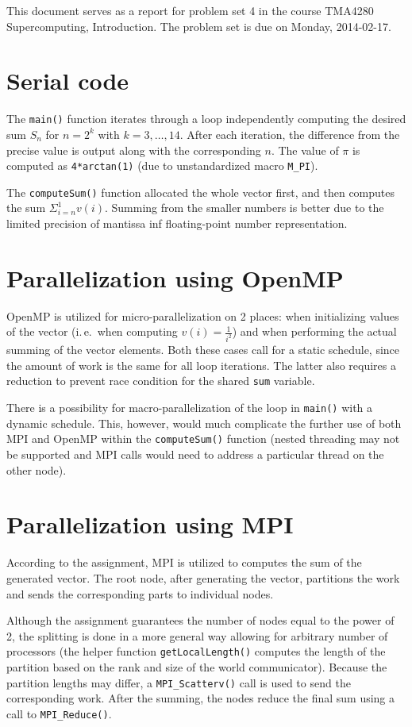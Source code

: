 \documentclass[12pt]{simple-assignment} %
\begin{document}
\noindent
This document serves as a report for problem set 4 in the course TMA4280 Supercomputing, Introduction. The problem set is due on Monday, 2014-02-17.

\section{Serial code}
The \texttt{main()} function iterates through a loop independently computing the desired sum $S_n$ for $n = 2^k$ with $k = 3, \dots, 14$. After each iteration, the difference from the precise value is output along with the corresponding $n$. The value of $\pi$ is computed as \texttt{4*arctan(1)} (due to unstandardized macro \texttt{M\_PI}).

The \texttt{computeSum()} function allocated the whole vector first, and then computes the sum $\Sigma_{i=n}^{1}v(i)$. Summing from the smaller numbers is better due to the limited precision of mantissa inf floating-point number representation.

\section{Parallelization using OpenMP}
OpenMP is utilized for micro-parallelization on 2 places: when initializing values of the vector (i.\,e.\ when computing $v(i)=\frac{1}{i^2}$) and when performing the actual summing of the vector elements. Both these cases call for a static schedule, since the amount of work is the same for all loop iterations. The latter also requires a reduction to prevent race condition for the shared \texttt{sum} variable.

There is a possibility for macro-parallelization of the loop in \texttt{main()} with a dynamic schedule. This, however, would much complicate the further use of both MPI and OpenMP within the \texttt{computeSum()} function (nested threading may not be supported and MPI calls would need to address a particular thread on the other node).

\section{Parallelization using MPI}
According to the assignment, MPI is utilized to computes the sum of the generated vector. The root node, after generating the vector, partitions the work and sends the corresponding parts to individual nodes. 

Although the assignment guarantees the number of nodes equal to the power of 2, the splitting is done in a more general way allowing for arbitrary number of processors (the helper function \texttt{getLocalLength()} computes the length of the partition based on the rank and size of the world communicator). Because the partition lengths may differ, a \texttt{MPI\_Scatterv()} call is used to send the corresponding work. After the summing, the nodes reduce the final sum using a call to \texttt{MPI\_Reduce()}.
\end{document}
